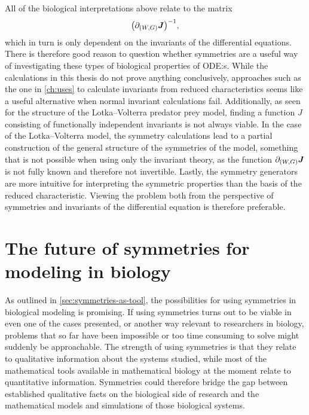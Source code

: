 All of the biological interpretations above relate to the matrix
\begin{equation*}
  \left(\partial_{(W, G)} \vect{J}\right)^{-1},
\end{equation*}
which in turn is only dependent on the invariants of the differential equations.
There is therefore good reason to question whether symmetries are a useful way of investigating these types of biological properties of ODE:s.
While the calculations in this thesis do not prove anything conclusively, approaches such as the one in \cref{ch:uses} to calculate invariants from reduced characteristics seems like a useful alternative when normal invariant calculations fail.
Additionally, as seen for the structure of the Lotka--Volterra predator prey model, finding a function \(J\) consisting of functionally independent invariants is not always viable.
In the case of the Lotka--Volterra model, the symmetry calculations lead to a partial construction of the general structure of the symmetries of the model, something that is not possible when using only the invariant theory, as the function \(\partial_{(W, G)} \boldsymbol{J}\) is not fully known and therefore not invertible.
Lastly, the symmetry generators are more intuitive for interpreting the symmetric properties than the basis of the reduced characteristic.
Viewing the problem both from the perspective of symmetries and invariants of the differential equation is therefore preferable.

\section{The future of symmetries for modeling in biology} \label{sec:future}

As outlined in \cref{sec:symmetries-as-tool}, the possibilities for using symmetries in biological modeling is promising.
If using symmetries turns out to be viable in even one of the cases presented, or another way relevant to researchers in biology, problems that so far have been impossible or too time consuming to solve might suddenly be approachable.
The strength of using symmetries is that they relate to qualitative information about the systems studied, while most of the mathematical tools available in mathematical biology at the moment relate to quantitative information.
Symmetries could therefore bridge the gap between established qualitative facts on the biological side of research and the mathematical models and simulations of those biological systems.

